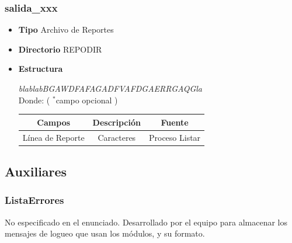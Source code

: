 \documentclass[a4paper,10pt,titlepage]{article}
\begin{document}
		\subsubsection{salida\_xxx}

			\begin {itemize}
				\item \textbf{Tipo} {Archivo de Reportes}
				\item \textbf{Directorio} {REPODIR}
				\item \textbf{Estructura} {\textit{blablabBGAWDFAFAGADFVAFDGAERRGAQGla}\\
					Donde: (	$^*$campo  opcional )\ 
					\begin{table}[H]
					\centering
					\begin{tabular}{| c | c | c |}
						\hline
						Campos 	& Descripción & Fuente	\\
						\hline
							Línea de Reporte  & Caracteres & Proceso Listar\\
						\hline 
						
					\end{tabular}
					\end{table}
				}
			\end{itemize}
	

	\subsection{Auxiliares}
	
		\subsubsection{ListaErrores}
	
No especificado en el enunciado. Desarrollado por el equipo para almacenar los mensajes de logueo que usan los módulos, y su formato.
\end{document}
